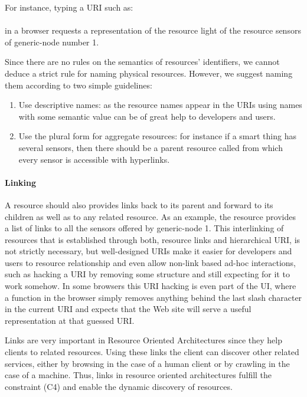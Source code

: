 For instance, typing a URI such as:\\
\\ 
in a browser requests a representation of the resource light of the resource sensors of generic-node number 1.

Since there are no rules on the semantics of resources' identifiers, we cannot deduce a strict rule for naming physical resources. However, we suggest naming them according to two simple guidelines:
\begin{enumerate}
 \item Use descriptive names: as the resource names appear in the URIs using names with some semantic value can be of great help to developers and users.
 \item Use the plural form for aggregate resources: for instance if a smart thing has several sensors, then there should be a parent resource called  from which every sensor is accessible with hyperlinks. 
\end{enumerate}

\paragraph{Linking}A resource should also provides links back to its parent and forward to its children as well as to any related resource. As an example, the resource 
provides a list of links to all the sensors offered by generic-node 1. This interlinking of resources that is established through both, resource links and hierarchical URI, is not strictly necessary, but well-designed URIs make it easier for developers and users to  resource relationship and even allow non-link based ad-hoc interactions, such as hacking a URI by removing some structure and still expecting for it to work somehow. In some browsers this URI hacking is even part of the UI, where a  function in the browser simply removes anything behind the last slash character in the current URI and expects that the Web site will serve a useful representation at that guessed URI.

Links are very important in Resource Oriented Architectures since they help clients to  related resources. Using these links the client can discover other related services, either by browsing in the case of a human client or by crawling in the case of a machine. Thus, links in resource oriented architectures fulfill the constraint (C4) and enable the dynamic discovery of resources.

